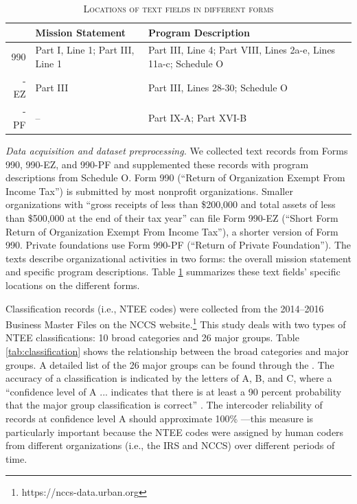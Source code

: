 \documentclass[11pt]{article}
\begin{document}
\begin{table}[]
    \centering
    \begin{tabularx}{0.8\textwidth}{r|X|X}
    	 \hline
         & Mission Statement & Program Description \\
         \hline
         990 & Part I, Line 1; Part III, Line 1 & Part III, Line 4; Part VIII, Lines 2a-e, Lines 11a-c; Schedule O \\
         \hdashline
         990-EZ & Part III & Part III, Lines 28-30; Schedule O \\
         \hdashline
         990-PF & -- & Part IX-A; Part XVI-B \\
         \hline
    \end{tabularx}
    \caption{\textsc{Locations of text fields in different forms}} \label{tab:text_loc}
\end{table}

\textit{Data acquisition and dataset preprocessing.} We collected text records from Forms 990, 990-EZ, and 990-PF and supplemented these records with program descriptions from Schedule O. Form 990 (``Return of Organization Exempt From Income Tax'') is submitted by most nonprofit organizations. Smaller organizations with ``gross receipts of less than \$200,000 and total assets of less than \$500,000 at the end of their tax year'' \parencite[1]{USInternalRevenueService2017InstructionsForm2018} can file Form 990-EZ (``Short Form Return of Organization Exempt From Income Tax''), a shorter version of Form 990. Private foundations use Form 990-PF (``Return of Private Foundation''). The texts describe organizational activities in two forms: the overall mission statement and specific program descriptions. Table \ref{tab:text_loc} summarizes these text fields' specific locations on the different forms.

Classification records (i.e., NTEE codes) were collected from the 2014--2016 Business Master Files on the NCCS website.\footnote{https://nccs-data.urban.org} This study deals with two types of NTEE classifications: 10 broad categories and 26 major groups. Table \ref{tab:classification} shows the relationship between the broad categories and major groups. A detailed list of the 26 major groups can be found through the \textcite{USInternalRevenueServiceExemptOrganizationsBusiness2014}. The accuracy of a classification is indicated by the letters of A, B, and C, where a ``confidence level of A ... indicates that there is at least a 90 percent probability that the major group classification is correct'' \parencite[16]{NationalCenterforCharitableStatisticsGuideUsingNCCS2006}. The intercoder reliability of records at confidence level A should approximate 100\% \parencite[147]{StengelGettingItRight1998}---this measure is particularly important because the NTEE codes were assigned by human coders from different organizations (i.e., the IRS and NCCS) over different periods of time.
\end{document}
